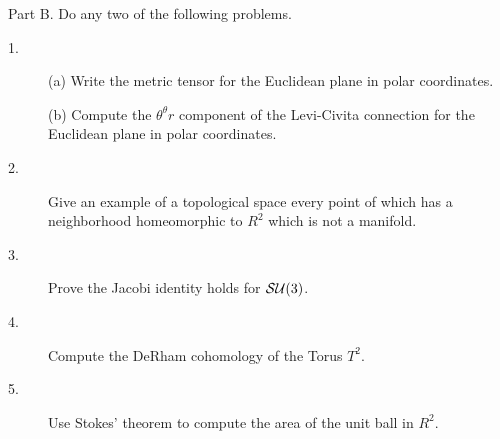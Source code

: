 \documentclass{article}
\begin{document}
Part B. Do any two of the following problems.
\begin{description}

\item[1.] (a)
Write the metric tensor for the Euclidean plane in polar coordinates.

\item[\quad] (b)
Compute the $\theta^\theta r$ component of the Levi-Civita connection for
the Euclidean plane in polar coordinates.

\item[2.]
Give an example of a topological space every point of which has a
neighborhood homeomorphic to $R^2$ which is not a manifold.

\item[3.]
Prove the Jacobi identity holds for ${\cal {SU}} (3)$.

\item[4.]
Compute the DeRham cohomology of the Torus $T^2$.

\item[5.]
Use Stokes' theorem to compute the area of the unit ball in $R^2$.





\end{description}    
\end{document}
